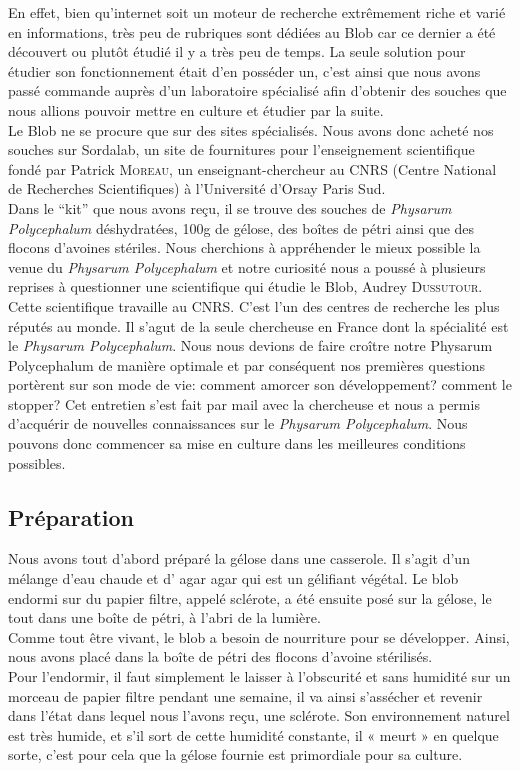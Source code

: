 \documentclass[]{report}
\theoremstyle{definition}
\begin{document}
{En effet, bien qu’internet soit un moteur de recherche extrêmement riche et varié en informations, très peu de rubriques sont dédiées au Blob car ce dernier a été découvert ou plutôt étudié il y a très peu de temps. La seule solution pour étudier son fonctionnement était d’en posséder un, c’est ainsi que nous avons passé commande auprès d’un laboratoire spécialisé afin d’obtenir des souches que nous allions pouvoir mettre en culture et étudier par la suite.}\\
{Le Blob ne se procure que sur des sites spécialisés. Nous avons donc acheté nos souches sur Sordalab, un site de fournitures pour l’enseignement scientifique fondé par Patrick \textsc{Moreau}, un enseignant-chercheur au CNRS (Centre National de Recherches Scientifiques) à l’Université d’Orsay Paris Sud.}\\
{Dans le “kit” que nous avons reçu, il se trouve des souches de \textit{Physarum Polycephalum} déshydratées, 100g de gélose, des boîtes de pétri ainsi que des flocons d’avoines stériles. 
Nous cherchions à appréhender le mieux possible la venue du \textit{Physarum Polycephalum} et notre curiosité nous a poussé à plusieurs reprises à questionner une scientifique qui étudie le Blob, Audrey \textsc{Dussutour}.
Cette scientifique travaille au CNRS. C’est l'un des centres de recherche les plus réputés au monde. Il s’agut de la seule chercheuse en France dont la spécialité est le \textit{Physarum Polycephalum}. 
Nous nous devions de faire croître notre Physarum Polycephalum de manière optimale et par conséquent nos premières questions portèrent sur son mode de vie: comment amorcer son développement? comment le stopper?
Cet entretien s’est fait par mail avec la chercheuse et nous a permis d'acquérir de nouvelles connaissances sur le \textit{Physarum Polycephalum}. Nous pouvons donc commencer sa mise en culture dans les meilleures conditions possibles.}

\subsection{Préparation}

{Nous avons tout d’abord préparé la gélose dans une casserole. Il s’agit d’un mélange d’eau chaude et d’ agar agar qui est un gélifiant végétal.
Le blob endormi sur du papier filtre, appelé sclérote, a été ensuite posé sur la gélose, le tout dans une boîte de pétri, à l’abri de la lumière.}\\
{Comme tout être vivant, le blob a besoin de nourriture pour se développer.
Ainsi, nous avons placé dans la boîte de pétri des flocons d’avoine stérilisés.}\\
{Pour l’endormir, il faut simplement le laisser à l’obscurité et sans humidité sur un morceau de papier filtre pendant une semaine, il va ainsi s’assécher et revenir dans l’état dans lequel nous l’avons reçu, une sclérote. Son environnement naturel est très humide, et s’il sort de cette humidité constante, il « meurt » en quelque sorte, c’est pour cela que la gélose fournie est primordiale pour sa culture.}
\end{document}

